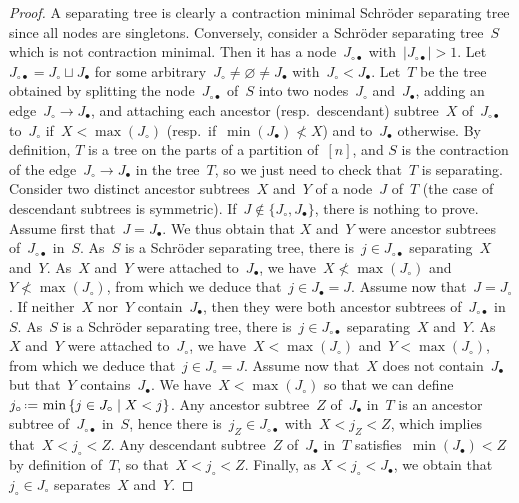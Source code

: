 \documentclass{amsart}
\theoremstyle{definition}
\newcommand{\set}[2]{\left\{ #1 \;\middle|\; #2 \right\}} %
\newcommand{\eqdef}{\mbox{\,\raisebox{0.2ex}{\scriptsize\ensuremath{\mathrm:}}\ensuremath{=}\,}} %
\begin{document}
\begin{proof}
A separating tree is clearly a contraction minimal Schröder separating tree since all nodes are singletons.
Conversely, consider a Schröder separating tree~$S$ which is not contraction minimal.
Then it has a node~$J_{\circ\bullet}$ with~$|J_{\circ\bullet}| > 1$.
Let~$J_{\circ\bullet} = J_\circ \sqcup J_\bullet$ for some arbitrary~$J_\circ \ne \varnothing \ne J_\bullet$ with~$J_\circ < J_\bullet$.
Let~$T$ be the tree obtained by splitting the node~$J_{\circ\bullet}$ of~$S$ into two nodes~$J_\circ$ and~$J_\bullet$, adding an edge~$J_\circ \to J_\bullet$, and attaching each ancestor (resp.~descendant) subtree~$X$ of~$J_{\circ\bullet}$ to~$J_\circ$ if~$X < \max(J_\circ)$ (resp.~if~$\min(J_\bullet) \not< X$) and to~$J_\bullet$ otherwise.
By definition, $T$ is a tree on the parts of a partition of~$[n]$, and $S$ is the contraction of the edge~$J_\circ \to J_\bullet$ in the tree~$T$, so we just need to check that~$T$ is separating.
Consider two distinct ancestor subtrees~$X$ and~$Y$ of a node~$J$ of~$T$ (the case of descendant subtrees is symmetric).
If~$J \notin \{J_\circ, J_\bullet\}$, there is nothing to prove.
Assume first that~$J = J_\bullet$.
We thus obtain that $X$ and~$Y$ were ancestor subtrees of~$J_{\circ\bullet}$ in~$S$.
As~$S$ is a Schröder separating tree, there is~$j \in J_{\circ\bullet}$ separating~$X$ and~$Y$.
As~$X$ and~$Y$ were attached to~$J_\bullet$, we have~$X \not < \max(J_\circ)$ and~$Y \not< \max(J_\circ)$, from which we deduce that~$j \in J_\bullet = J$.
Assume now that~$J = J_\circ$.
If neither~$X$ nor~$Y$ contain~$J_\bullet$, then they were both ancestor subtrees of~$J_{\circ\bullet}$ in~$S$.
As~$S$ is a Schröder separating tree, there is~$j \in J_{\circ\bullet}$ separating~$X$ and~$Y$.
As~$X$ and~$Y$ were attached to~$J_\circ$, we have~$X < \max(J_\circ)$ and~$Y < \max(J_\circ)$, from which we deduce that~$j \in J_\circ = J$.
Assume now that~$X$ does not contain~$J_\bullet$ but that~$Y$ contains~$J_\bullet$.
We have~$X < \max(J_\circ)$ so that we can define~$j_\circ \eqdef \min\set{j \in J_\circ}{X < j}$.
Any ancestor subtree~$Z$ of~$J_\bullet$ in~$T$ is an ancestor subtree of~$J_{\circ\bullet}$ in~$S$, hence there is~$j_Z \in J_{\circ\bullet}$ with~$X < j_Z < Z$, which implies that~$X < j_\circ < Z$.
Any descendant subtree~$Z$ of~$J_\bullet$ in~$T$ satisfies~$\min(J_\bullet) < Z$ by definition of~$T$, so that~$X < j_\circ < Z$.
Finally, as $X < j_\circ < J_\bullet$, we obtain that~$j_\circ \in J_\circ$ separates~$X$ and~$Y$.

\end{proof}
\end{document}
